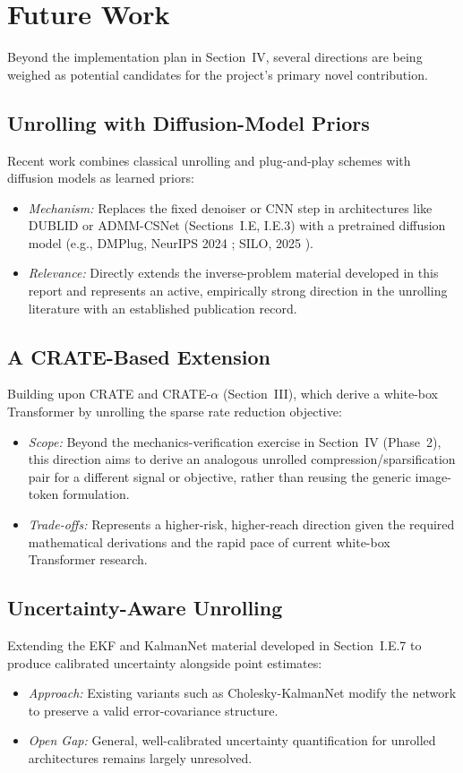 \documentclass[conference]{IEEEtran}
\begin{document}
\section{Future Work}
Beyond the implementation plan in Section~IV, several directions are being weighed as potential candidates for the project's primary novel contribution.

\subsection{Unrolling with Diffusion-Model Priors}
Recent work combines classical unrolling and plug-and-play schemes with diffusion models as learned priors:
\begin{itemize}
    \item[\textbullet] \textit{Mechanism:} Replaces the fixed denoiser or CNN step in architectures like DUBLID or ADMM-CSNet (Sections~I.E, I.E.3) with a pretrained diffusion model (e.g., DMPlug, NeurIPS 2024 \cite{wang2024dmplug}; SILO, 2025 \cite{raphaeli2025silo}).
    \item[\textbullet] \textit{Relevance:} Directly extends the inverse-problem material developed in this report and represents an active, empirically strong direction in the unrolling literature with an established publication record.
\end{itemize}

\subsection{A CRATE-Based Extension}
Building upon CRATE and CRATE-$\alpha$ (Section~III), which derive a white-box Transformer by unrolling the sparse rate reduction objective:
\begin{itemize}
    \item[\textbullet] \textit{Scope:} Beyond the mechanics-verification exercise in Section~IV (Phase~2), this direction aims to derive an analogous unrolled compression/sparsification pair for a different signal or objective, rather than reusing the generic image-token formulation.
    \item[\textbullet] \textit{Trade-offs:} Represents a higher-risk, higher-reach direction given the required mathematical derivations and the rapid pace of current white-box Transformer research.
\end{itemize}

\subsection{Uncertainty-Aware Unrolling}
Extending the EKF and KalmanNet material developed in Section~I.E.7 to produce calibrated uncertainty alongside point estimates:
\begin{itemize}
    \item[\textbullet] \textit{Approach:} Existing variants such as Cholesky-KalmanNet \cite{ko2024cholesky} modify the network to preserve a valid error-covariance structure.
    \item[\textbullet] \textit{Open Gap:} General, well-calibrated uncertainty quantification for unrolled architectures remains largely unresolved.
\end{itemize}
\end{document}
